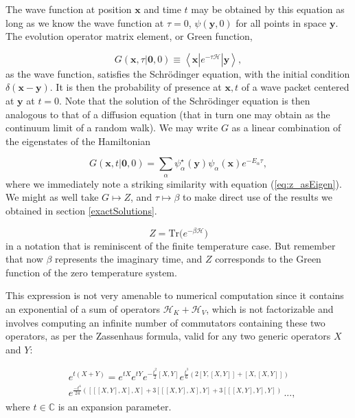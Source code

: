 \documentclass[10pt, twocolumn, twoside]{article}
\begin{document}
The wave function at position $\bm x$ and time $t$ may be obtained by this equation as long as we know the wave function at $\tau = 0$, $\psi (\bm y, 0)$ for all points in space $\bm y$. The evolution operator matrix element, or Green function, 

\begin{equation}
G ( \bm x, \tau | \bm 0, 0 ) \equiv \left\langle \bm x | e^{-\tau \mathcal{H}} | \bm y \right\rangle ,
\end{equation}
as the wave function, satisfies the Schr\"odinger equation, with the initial condition $\delta ( \bm x - \bm y )$. It is then the probability of presence at $\bm x, t$ of a wave packet centered at $\bm y$ at $t = 0$. Note that the solution of the Schr\"odinger equation is then analogous to that of a diffusion equation (that in turn one may obtain as the continuum limit of a random walk). We may write $G$ as a linear combination of the eigenstates of the Hamiltonian

\begin{equation}
G (\bm x, t | \bm 0, 0) = \sum_\alpha \psi_\alpha^\star (\bm y) \psi_\alpha (\bm x) e^{-E_\alpha \tau} ,
\end{equation}
where we immediately note a striking similarity with equation (\ref{eq:z_asEigen}). We might as well take $G \mapsto Z$, and $\tau \mapsto \beta$ to make direct use of the results we obtained in section \ref{exactSolutions}.

\begin{equation}
Z = \text{Tr} \big( e^{-\beta \mathcal{H} } \big)
\end{equation}
in a notation that is reminiscent of the finite temperature case. But remember that now $\beta$ represents the imaginary time, and $Z$ corresponds to the Green function of the zero temperature system.
 
This expression is not very amenable to numerical computation since it contains an exponential of a sum of operators $\mathcal{H}_K + \mathcal{H}_V$, which is not factorizable and involves computing an infinite number of commutators containing these two operators, as per the Zassenhaus formula, valid for any two generic operators $X$ and $Y$:

\begin{equation}\label{eq:zassenhaus}
\begin{split}
&e^{t(X+Y)}=e^{tX} e^{tY} e^{-{\frac {t^{2}}{2}}[X,Y]} e^{{\frac {t^{3}}{6}}(2[Y,[X,Y]]+[X,[X,Y]])} \\
&e^{{\frac {-t^{4}}{24}}([[[X,Y],X],X]+3[[[X,Y],X],Y]+3[[[X,Y],Y],Y])} \, ... , 
\end{split}
\end{equation}
where $t \in \mathbb{C}$ is an expansion parameter.
\end{document}
